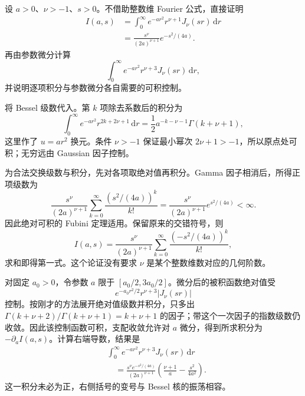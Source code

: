 \begin{exercise}\label{b2:ex:A2-gaussian}
设 \(a>0\)、\(\nu>-1\)、\(s>0\)。不借助整数维 Fourier 公式，直接证明
\[
 \begin{aligned}
 I(a,s)&=\int_0^\infty e^{-ar^2}r^{\nu+1}J_\nu(sr)\,\mathrm dr\\
       &=\frac{s^\nu}{(2a)^{\nu+1}}e^{-s^2/(4a)}.
 \end{aligned}
\]
再由参数微分计算
\[
 \int_0^\infty e^{-ar^2}r^{\nu+3}J_\nu(sr)\,\mathrm dr,
\]
并说明逐项积分与参数微分各自需要的可积控制。
\end{exercise}
\begin{solution}
将 Bessel 级数代入。第 \(k\) 项除去系数后的积分为
\[
 \int_0^\infty e^{-ar^2}r^{2k+2\nu+1}\,\mathrm dr
 =\frac12a^{-k-\nu-1}\Gamma(k+\nu+1),
\]
这里作了 \(u=ar^2\) 换元。条件 \(\nu>-1\) 保证最小幂次
\(2\nu+1>-1\)，所以原点处可积；无穷远由 Gaussian 因子控制。

为合法交换级数与积分，先对各项取绝对值再积分。Gamma 因子相消后，所得正项级数为
\[
 \frac{s^\nu}{(2a)^{\nu+1}}
       \sum_{k=0}^\infty\frac{(s^2/(4a))^k}{k!}
 =\frac{s^\nu}{(2a)^{\nu+1}}e^{s^2/(4a)}<\infty.
\]
因此绝对可积的 Fubini 定理适用。保留原来的交错符号，则
\[
 I(a,s)
 =\frac{s^\nu}{(2a)^{\nu+1}}
       \sum_{k=0}^\infty\frac{(-s^2/(4a))^k}{k!},
\]
求和即得第一式。这个论证没有要求 \(\nu\) 是某个整数维数对应的几何阶数。

对固定 \(a_0>0\)，令参数 \(a\) 限于
\([a_0/2,3a_0/2]\)。微分后的被积函数绝对值受
\[
 e^{-a_0r^2/2}r^{\nu+3}|J_\nu(sr)|
\]
控制。按刚才的方法展开绝对值级数并积分，只多出
\(\Gamma(k+\nu+2)/\Gamma(k+\nu+1)=k+\nu+1\) 的因子；带这个一次因子的指数级数仍收敛。因此该控制函数可积，支配收敛允许对 \(a\) 微分，得到所求积分为
\(-\partial_a I(a,s)\)。计算右端导数，结果是
\[
 \begin{aligned}
 &\int_0^\infty e^{-ar^2}r^{\nu+3}J_\nu(sr)\,\mathrm dr\\
 &\hspace{1em}=\frac{s^\nu e^{-s^2/(4a)}}{(2a)^{\nu+1}}
       \left(\frac{\nu+1}{a}-\frac{s^2}{4a^2}\right).
 \end{aligned}
\]
这一积分未必为正，右侧括号的变号与 Bessel 核的振荡相容。
\end{solution}

